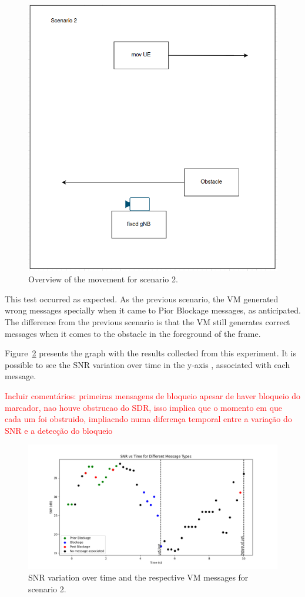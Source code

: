 \begin{figure}[H]
    \centering
    \includegraphics[width=0.5\linewidth]{figures/scenario2}
    \caption{Overview of the movement for scenario 2.}
    \label{fig:test_movUE_obst}
\end{figure}

This test occurred as expected.
As the previous scenario, the VM generated wrong messages specially when it came to Pior Blockage messages, as anticipated.
The difference from the previous scenario is that the VM still generates correct messages when it comes to the obstacle in the foreground of the frame.


Figure~\ref{fig:results_2} presents the graph with the results collected from this experiment.
It is possible to see the SNR variation over time in the y-axis , associated with each message.

\textcolor{red}{Incluir comentários: primeiras mensagens de bloqueio apesar de haver bloqueio do marcador, nao houve obstrucao do SDR, isso implica que o momento em que cada um foi obstruido, impliacndo numa diferença temporal entre a variação do SNR e a detecção do bloqueio}


\begin{figure}[H]
    \centering
    \includegraphics[width=\linewidth]{figures/results_2}
    \caption{SNR variation over time and the respective VM messages for scenario 2.}
    \label{fig:results_2}
\end{figure}

